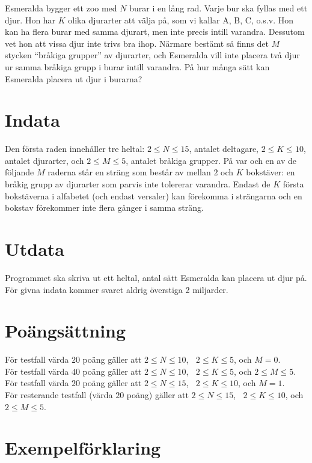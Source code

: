 
Esmeralda bygger ett zoo med $N$ burar i en lång rad. Varje bur ska fyllas med ett djur. Hon har $K$ olika djurarter att välja på, som vi kallar A, B, C, o.s.v. Hon kan ha flera burar med samma djurart, men inte precis intill varandra. Dessutom vet hon att vissa djur inte trivs bra ihop. Närmare bestämt så finns det $M$ stycken ``bråkiga grupper'' av djurarter, och Esmeralda vill inte placera två djur ur samma bråkiga grupp i burar intill varandra. På hur många sätt kan Esmeralda placera ut djur i burarna?

\section*{Indata}
Den första raden innehåller tre heltal: $2\le N \le 15$, antalet deltagare, $2\le K \le 10$, antalet djurarter, och $2 \le M\le 5$, antalet bråkiga grupper. På var och en av de följande $M$ raderna står en sträng som består av mellan $2$ och $K$ bokstäver: en bråkig grupp av djurarter som parvis inte tolererar varandra. Endast de $K$ första bokstäverna i alfabetet (och endast versaler) kan förekomma i strängarna och en bokstav förekommer inte flera gånger i samma sträng.

\section*{Utdata}
Programmet ska skriva ut ett heltal, antal sätt Esmeralda kan placera ut djur på. För givna indata kommer svaret aldrig överstiga 2 miljarder.

\section*{Poängsättning}
För testfall värda $20$ poäng gäller att $2\le N \le 10$, $\;\;2\le K \le 5$, och $M=0$. \\
För testfall värda $40$ poäng gäller att $2\le N \le 10$, $\;\;2\le K \le 5$, och $2 \le M\le 5$. \\
För testfall värda $20$ poäng gäller att $2\le N \le 15$, $\;\;2\le K \le 10$, och $M=1$. \\
För resterande testfall (värda $20$ poäng) gäller att $2\le N \le 15$, $\;\;2\le K \le 10$, och $2 \le M\le 5$. \\

\section*{Exempelförklaring}

